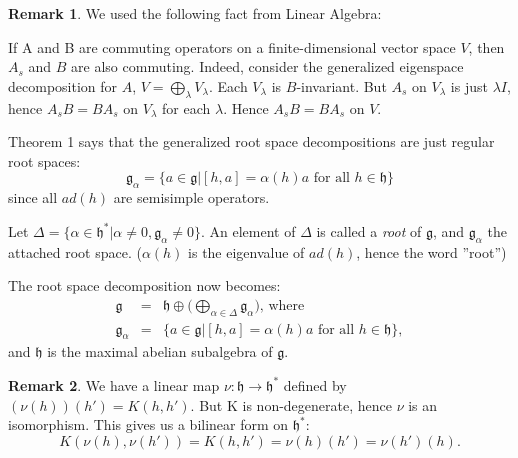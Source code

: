 \documentclass[12pt]{amsart}
\theoremstyle{definition}
\theoremstyle{definition}
\theoremstyle{definition}
\newtheorem*{rem}{Remark}
\numberwithin{equation}{subsection}
\newcommand{\g}{\mathfrak{g}}
\newcommand{\h}{\mathfrak{h}}
\begin{document}
\begin{rem}
We used the following fact from Linear Algebra:

If A and B are commuting operators on a finite-dimensional vector
space $V$, then $A_s$ and $B$ are also commuting. Indeed, consider
the generalized eigenspace decomposition for $A$, $V = \bigoplus_{\lambda}{V_\lambda}$.
Each $V_\lambda$ is $B$-invariant. But $A_s$ on $V_\lambda$ is just $\lambda I$, hence
$A_s B = B A_s$ on $V_\lambda$ for each $\lambda$. Hence $A_s B = B A_s$ on $V$.
\end{rem}

Theorem 1 says that the generalized root space decompositions are just regular root spaces:
$$\g_\alpha = \{ a \in \g | [h,a] = \alpha(h) a \textrm{ for all } h \in \h \}$$
since all $ad(h)$ are semisimple operators.

Let $\Delta = \{ \alpha \in \h^* | \alpha \neq 0, \g_\alpha \neq 0 \}$.
An element of $\Delta$ is called a \emph{root} of $\g$, and $\g_\alpha$ the attached root space.
($\alpha(h)$ is the eigenvalue of $ad(h)$, hence the word ''root'')

The root space decomposition now becomes:
\begin{eqnarray*}
\g&=&\h \oplus \Big(\bigoplus_{\alpha \in \Delta}{\g_\alpha}\Big)\text{, where}\\
\g_\alpha&=&\{ a \in \g | [h,a] = \alpha(h) a \textrm{ for all } h \in \h\},
\end{eqnarray*}
and $\h$ is the maximal abelian subalgebra of $\g$.

\begin{rem}
We have a linear map $\nu:\h \longrightarrow \h^*$ defined by $(\nu(h))(h') = K(h,h')$. But K is non-degenerate,
hence $\nu$ is an isomorphism. This gives us a bilinear form on $\h^*$: 
$$K(\nu(h), \nu(h')) = K(h,h') = \nu(h)(h') = \nu(h')(h).$$
\end{rem}
\end{document}
